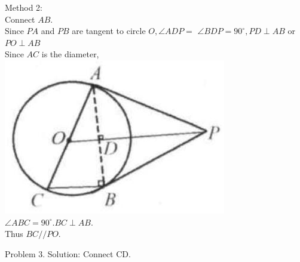 \documentclass[10pt]{article}
\begin{document}
Method 2:\\
Connect \(A B\).\\
Since \(P A\) and \(P B\) are tangent to circle \(O, \angle A D P=\) \(\angle B D P=90^{\circ}, P D \perp A B\) or \(P O \perp A B\)\\
Since \(A C\) is the diameter,\\
\includegraphics[max width=\textwidth]{2025_04_17_97bc1f7e44d93c271a88g-171(2)} \(\angle A B C=90^{\circ} . B C \perp A B\).\\
Thus \(B C / / P O\).

Problem 3. Solution:
Connect CD.
\end{document}
